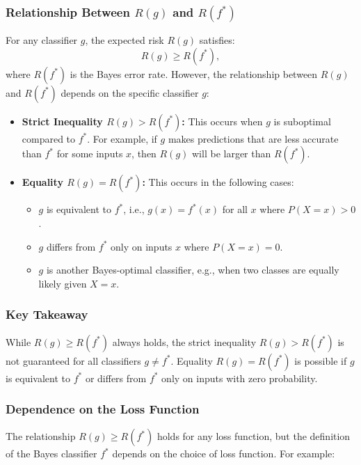 \begin{notechapter}
\subsubsection{Relationship Between \( R(g) \) and \( R(f^*) \)}
For any classifier \( g \), the expected risk \( R(g) \) satisfies:
\[
R(g) \geq R(f^*),
\]
where \( R(f^*) \) is the Bayes error rate. However, the relationship between \( R(g) \) and \( R(f^*) \) depends on the specific classifier \( g \):

\begin{itemize}
    \item \textbf{Strict Inequality \( R(g) > R(f^*) \):}
      This occurs when \( g \) is suboptimal compared to \( f^* \). For example, if \( g \) makes predictions that are less accurate than \( f^* \) for some inputs \( x \), then \( R(g) \) will be larger than \( R(f^*) \).

    \item \textbf{Equality \( R(g) = R(f^*) \):}
      This occurs in the following cases:
      \begin{itemize}
          \item \( g \) is equivalent to \( f^* \), i.e., \( g(x) = f^*(x) \) for all \( x \) where \( P(X = x) > 0 \).
          \item \( g \) differs from \( f^* \) only on inputs \( x \) where \( P(X = x) = 0 \).
          \item \( g \) is another Bayes-optimal classifier, e.g., when two classes are equally likely given \( X = x \).
      \end{itemize}
\end{itemize}

\subsubsection{Key Takeaway}
While \( R(g) \geq R(f^*) \) always holds, the strict inequality \( R(g) > R(f^*) \) is not guaranteed for all classifiers \( g \neq f^* \). Equality \( R(g) = R(f^*) \) is possible if \( g \) is equivalent to \( f^* \) or differs from \( f^* \) only on inputs with zero probability.

\subsubsection{Dependence on the Loss Function}
The relationship \( R(g) \geq R(f^*) \) holds for any loss function, but the definition of the Bayes classifier \( f^* \) depends on the choice of loss function. For example:


\end{notechapter}
